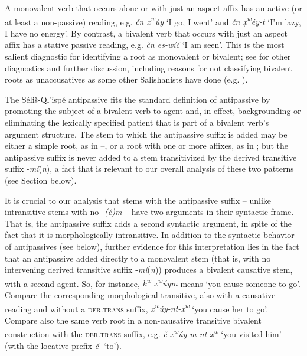 \documentclass[output=paper,colorlinks,citecolor=brown]{langscibook}
\begin{document}
A monovalent verb that occurs alone or with just an aspect affix has
an active (or at least a non-passive) reading, e.g. \emph{\v{c}n
 x\textsuperscript w\'uy} `I go, I went' and \emph{\v{c}n
 \d{x}\textsuperscript w\'ey-t} `I'm lazy, I have no energy'.  By
contrast, a bivalent verb that occurs with just an aspect affix has a
stative passive reading, e.g. \emph{\v{c}n es-w\'i\v{c}} `I am seen'.
This is the most salient diagnostic for identifying a root as
monovalent or bivalent; see  for other diagnostics
and further discussion, including reasons for not classifying bivalent
roots as unaccusatives as some other Salishanists have done
(e.g. \citealt{Gerdts:1991}).


The S\'eli\v{s}-Ql'isp\'e antipassive fits the standard definition of
antipassive by promoting the subject of a bivalent verb to agent and,
in effect, backgrounding or eliminating the lexically specified
patient that is part of a bivalent verb's argument structure.  The
stem to which the antipassive suffix is added may be either a simple
root, as in --, or a root with one or more affixes, as in ; but
the antipassive suffix is never added to a stem transitivized by the
derived transitive suffix -\emph{m\'i}(\emph{n}), a fact that is
relevant to our overall analysis of these two patterns (see Section 
below).


It is crucial to our analysis that stems with the antipassive
suffix -- unlike intransitive stems with no \emph{-(\'e)m} -- have two
arguments in their syntactic frame.  That is, the antipassive suffix
adds a second syntactic argument, in spite of the fact that it is
morphologically intransitive.  In addition to the syntactic behavior
of antipassives (see below), further evidence for this interpretation
lies in the fact that an antipassive added directly to a monovalent
stem (that is, with no intervening derived transitive suffix -\emph{m\'i}(\emph{n})) produces a bivalent causative stem, with a second
agent.  So, for instance, \emph{{k\textsuperscript w} x\textsuperscript
 w\'uym} means `you cause someone to go'.  Compare the corresponding
morphological transitive, also with a causative reading and without a
\textsc{der.trans} suffix, \emph{x\textsuperscript
 w\'uy-nt-x\textsuperscript w} `you cause her to go'.  Compare also the
same verb root in a non-causative transitive bivalent construction
with the \textsc{der.trans} suffix, e.g. \emph{\v{c}-x\textsuperscript
 w\'uy-m-nt-x\textsuperscript w} `you visited him' (with the locative
prefix \emph{\v{c}}- `to').
\end{document}
